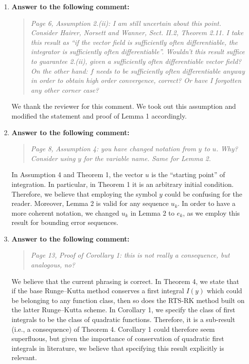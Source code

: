 \documentclass[10pt]{article}
\begin{document}
\begin{enumerate}
\item \textbf{Answer to the following comment:}
\begin{quote} \textit{Page 6, Assumption 2.(ii): I am still uncertain about this point. Consider Hairer, Norsett and Wanner, Sect. II.2, Theorem 2.11. I take this result as ``if the vector field is sufficiently often differentiable, the integrator is sufficiently often differentiable''. Wouldn’t this result suffice to guarantee 2.(ii), given a sufficiently often differentiable vector field? On the other hand: $f$ needs to be sufficiently often differentiable anyway in order to obtain high order convergence, correct? Or have I forgotten any other corner case?} \end{quote}
We thank the reviewer for this comment. We took out this assumption and modified the statement and proof of Lemma 1 accordingly.

\item \textbf{Answer to the following comment:}
\begin{quote} \textit{Page 8, Assumption 4: you have changed notation from $y$ to $u$. Why?	Consider using $y$ for the variable name. Same for Lemma 2.} \end{quote}
In Assumption 4 and Theorem 1, the vector $u$ is the ``starting point'' of integration. In particular, in Theorem 1 it is an arbitrary initial condition. Therefore, we believe that employing the symbol $y$ could be confusing for the reader. Moreover, Lemma 2 is valid for any sequence $u_k$. In order to have a more coherent notation, we changed $u_k$ in Lemma 2 to $e_k$, as we employ this result for bounding error sequences.

\item \textbf{Answer to the following comment:}
\begin{quote} \textit{Page 13, Proof of Corollary 1: this is not really a consequence, but analogous, no?} \end{quote}
We believe that the current phrasing is correct. In Theorem 4, we state that if the base Runge--Kutta method conserves a first integral $I(y)$ which could be belonging to any function class, then so does the RTS-RK method built on the latter Runge--Kutta scheme. In Corollary 1, we specify the class of first integrals to be the class of quadratic functions. Therefore, it is a sub-result (i.e., a consequence) of Theorem 4. Corollary 1 could therefore seem superfluous, but given the importance of conservation of quadratic first integrals in literature, we believe that specifying this result explicitly is relevant.


\end{enumerate}
\end{document}
